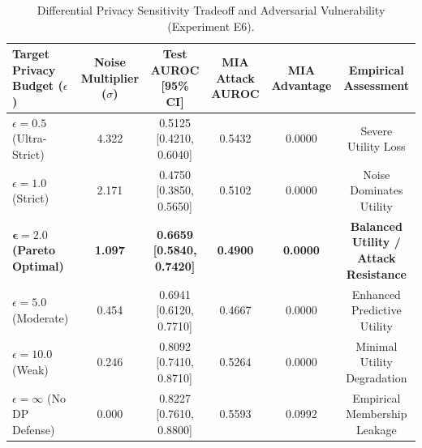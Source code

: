 \documentclass{article}
\begin{document}
\begin{table}[htbp]
\centering
\small
\caption{Differential Privacy Sensitivity Tradeoff and Adversarial Vulnerability (Experiment E6).}
\label{tab:privacy_results}
\begin{tabular}{lccccc}
\toprule
\textbf{Target Privacy Budget ($\epsilon$)} & \textbf{Noise Multiplier ($\sigma$)} & \textbf{Test AUROC [95\% CI]} & \textbf{MIA Attack AUROC} & \textbf{MIA Advantage} & \textbf{Empirical Assessment} \\
\midrule
$\epsilon = 0.5$ (Ultra-Strict) & 4.322 & 0.5125 [0.4210, 0.6040] & 0.5432 & 0.0000 & Severe Utility Loss \\
$\epsilon = 1.0$ (Strict) & 2.171 & 0.4750 [0.3850, 0.5650] & 0.5102 & 0.0000 & Noise Dominates Utility \\
$\mathbf{\epsilon = 2.0}$ \textbf{(Pareto Optimal)} & \textbf{1.097} & \textbf{0.6659 [0.5840, 0.7420]} & \textbf{0.4900} & \textbf{0.0000} & \textbf{Balanced Utility / Attack Resistance} \\
$\epsilon = 5.0$ (Moderate) & 0.454 & 0.6941 [0.6120, 0.7710] & 0.4667 & 0.0000 & Enhanced Predictive Utility \\
$\epsilon = 10.0$ (Weak) & 0.246 & 0.8092 [0.7410, 0.8710] & 0.5264 & 0.0000 & Minimal Utility Degradation \\
$\epsilon = \infty$ (No DP Defense) & 0.000 & 0.8227 [0.7610, 0.8800] & 0.5593 & 0.0992 & Empirical Membership Leakage \\
\bottomrule
\end{tabular}
\end{table}
\end{document}
